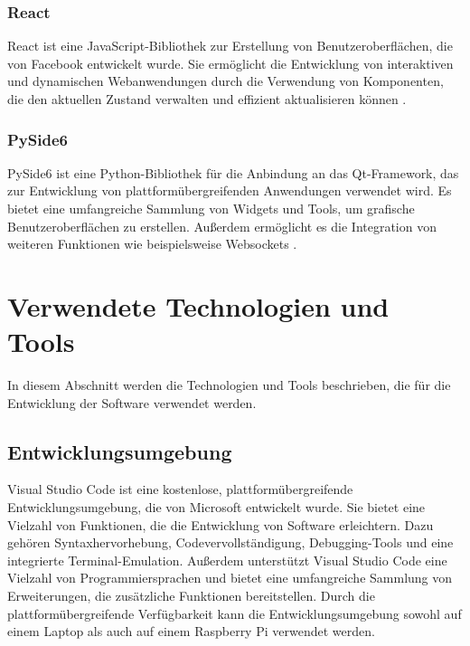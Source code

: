         \subsubsection{React} React ist eine JavaScript-Bibliothek zur Erstellung von Benutzeroberflächen, die von Facebook entwickelt wurde. Sie ermöglicht die Entwicklung von interaktiven und dynamischen Webanwendungen durch die Verwendung von Komponenten, die den aktuellen Zustand verwalten und effizient aktualisieren können \cite{React}.
        \subsubsection{PySide6} PySide6 ist eine Python-Bibliothek für die Anbindung an das Qt-Framework, das zur Entwicklung von plattformübergreifenden Anwendungen verwendet wird. Es bietet eine umfangreiche Sammlung von Widgets und Tools, um grafische Benutzeroberflächen zu erstellen. Außerdem ermöglicht es die Integration von weiteren Funktionen wie beispielsweise Websockets \cite{QtPython}. 

\section{Verwendete Technologien und Tools}
In diesem Abschnitt werden die Technologien und Tools beschrieben, die für die Entwicklung der Software verwendet werden. 

    \subsection{Entwicklungsumgebung}
    Visual Studio Code ist eine kostenlose, plattformübergreifende Entwicklungsumgebung, die von Microsoft entwickelt wurde. Sie bietet eine Vielzahl von Funktionen, die die Entwicklung von Software erleichtern. Dazu gehören Syntaxhervorhebung, Codevervollständigung, Debugging-Tools und eine integrierte Terminal-Emulation. Außerdem unterstützt Visual Studio Code eine Vielzahl von Programmiersprachen und bietet eine umfangreiche Sammlung von Erweiterungen, die zusätzliche Funktionen bereitstellen. Durch die plattformübergreifende Verfügbarkeit kann die Entwicklungsumgebung sowohl auf einem Laptop als auch auf einem Raspberry Pi verwendet werden.

    
